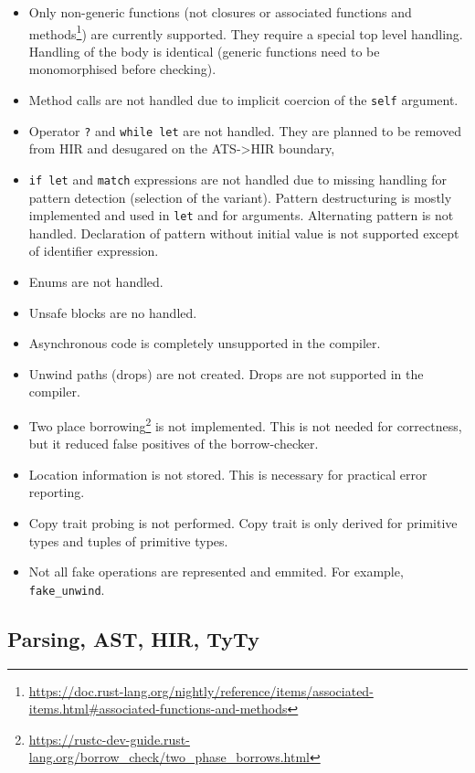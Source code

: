 \documentclass[
  11pt,
  twoside,symmetric]{report}
\providecommand{\tightlist}{%
  \setlength{\itemsep}{0pt}\setlength{\parskip}{0pt}}
\DeclareRobustCommand{\href}[2]{#2\footnote{\url{#1}}}
\begin{document}
\begin{itemize}
\tightlist
\item
  Only non-generic functions (not closures or
  \href{https://doc.rust-lang.org/nightly/reference/items/associated-items.html\#associated-functions-and-methods}{associated
  functions and methods}) are currently supported. They require a
  special top level handling. Handling of the body is identical (generic
  functions need to be monomorphised before checking).
\item
  Method calls are not handled due to implicit coercion of the
  \texttt{self} argument.
\item
  Operator \texttt{?} and \texttt{while\ let} are not handled. They are
  planned to be removed from HIR and desugared on the
  ATS-\textgreater HIR boundary,
\item
  \texttt{if\ let} and \texttt{match} expressions are not handled due to
  missing handling for pattern detection (selection of the variant).
  Pattern destructuring is mostly implemented and used in \texttt{let}
  and for arguments. Alternating pattern is not handled. Declaration of
  pattern without initial value is not supported except of identifier
  expression.
\item
  Enums are not handled.
\item
  Unsafe blocks are no handled.
\item
  Asynchronous code is completely unsupported in the compiler.
\item
  Unwind paths (drops) are not created. Drops are not supported in the
  compiler.
\item
  \href{https://rustc-dev-guide.rust-lang.org/borrow_check/two_phase_borrows.html}{Two
  place borrowing} is not implemented. This is not needed for
  correctness, but it reduced false positives of the borrow-checker.
\item
  Location information is not stored. This is necessary for practical
  error reporting.
\item
  Copy trait probing is not performed. Copy trait is only derived for
  primitive types and tuples of primitive types.
\item
  Not all fake operations are represented and emmited. For example,
  \texttt{fake\_unwind}.
\end{itemize}

\hypertarget{parsing-ast-hir-tyty}{%
\subsection{Parsing, AST, HIR, TyTy}\label{parsing-ast-hir-tyty}}
\end{document}
